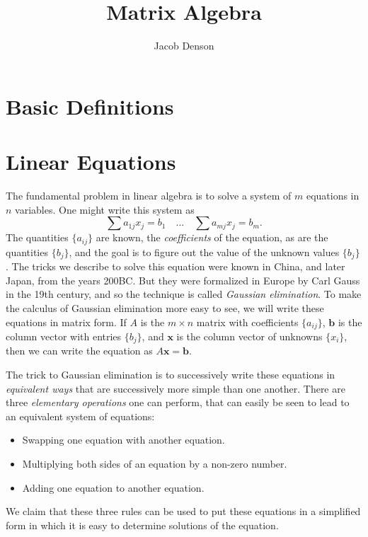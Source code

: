 

\title{Matrix Algebra}
\author{Jacob Denson}



\maketitle
\tableofcontents

\chapter{Basic Definitions}


\chapter{Linear Equations}

The fundamental problem in linear algebra is to solve a system of $m$ equations in $n$ variables. One might write this system as
%
\[ \sum a_{1j} x_j = b_1 \quad \dots \quad \sum a_{mj} x_j = b_m. \]
%
The quantities $\{ a_{ij} \}$ are known, the \emph{coefficients} of the equation, as are the quantities $\{ b_j \}$, and the goal is to figure out the value of the unknown values $\{ b_j \}$. The tricks we describe to solve this equation were known in China, and later Japan, from the years 200BC. But they were formalized in Europe by Carl Gauss in the 19th century, and so the technique is called \emph{Gaussian elimination}. To make the calculus of Gaussian elimination more easy to see, we will write these equations in matrix form. If $A$ is the $m \times n$ matrix with coefficients $\{ a_{ij} \}$, $\mathbf{b}$ is the column vector with entries $\{ b_j \}$, and $\mathbf{x}$ is the column vector of unknowns $\{ x_i \}$, then we can write the equation as $A\mathbf{x} = \mathbf{b}$.

The trick to Gaussian elimination is to successively write these equations in \emph{equivalent ways} that are successively more simple than one another. There are three \emph{elementary operations} one can perform, that can easily be seen to lead to an equivalent system of equations:
%
\begin{itemize}
    \item Swapping one equation with another equation.
    \item Multiplying both sides of an equation by a non-zero number.
    \item Adding one equation to another equation.
\end{itemize}
%
We claim that these three rules can be used to put these equations in a simplified form in which it is easy to determine solutions of the equation.

